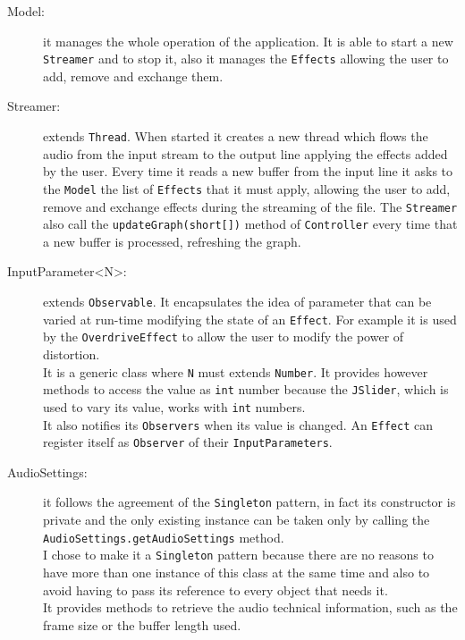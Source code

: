 \newpage
\begin{description}
  \item[Model:] it manages the whole operation of the application.
    It is able to start a new \texttt{Streamer} and to stop it, also it
    manages the \texttt{Effects} allowing the user to add, remove and exchange them. 
  \item[Streamer:] extends \texttt{Thread}. When started
    it creates a new thread which flows the audio from the input stream to
    the output line applying the effects added by the user. Every time
    it reads a new buffer from the input line it asks to the \texttt{Model}
    the list of \texttt{Effects} that it must apply, allowing the user
    to add, remove and exchange effects during the streaming of the file.
    The \texttt{Streamer} also call the \texttt{updateGraph(short[])}
    method of \texttt{Controller} every time that a new buffer is
    processed, refreshing the graph.
  \item[InputParameter<N>:] extends \texttt{Observable}. It %
    encapsulates the idea of parameter that can be varied at run-time 
    modifying the state of an \texttt{Effect}. For example it is used
    by the \texttt{OverdriveEffect} to allow the user to modify the
    power of distortion.\\
    It is a generic class where \texttt{N} must extends \texttt{Number}.
    It provides however methods to access the value as \texttt{int}
    number because the \texttt{JSlider}, which is used to vary its
    value, works with \texttt{int} numbers.\\
    It also notifies its \texttt{Observers} when its value is changed. 
    An \texttt{Effect} can register itself as \texttt{Observer} of their
    \texttt{InputParameters}.
  \item[AudioSettings:] it follows the agreement of the
    \texttt{Singleton} pattern, in fact its
    constructor is private and the only existing instance can be taken
    only by calling the \texttt{AudioSettings.getAudioSettings} method.\\
    I chose to make it a \texttt{Singleton} pattern because there are no reasons
    to have more than one instance of this class at the same time and
    also to avoid having to pass its reference to every object that
    needs it.\\
    It provides methods to retrieve the audio technical information, such
    as the frame size or the buffer length used.    
\end{description}


